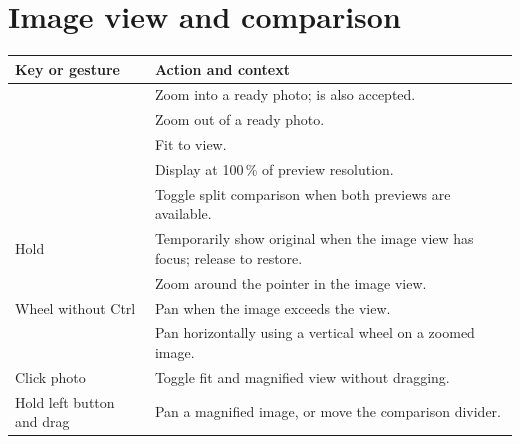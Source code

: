 \clearpage
\section*{Image view and comparison}
\begin{longtable}{@{}L{4.4cm}L{9.2cm}@{}}
\toprule Key or gesture & Action and context\\\midrule\endhead
{} & Zoom into a ready photo;  is also accepted.\\
 & Zoom out of a ready photo.\\
 & Fit to view.\\
 & Display at 100\,\% of preview resolution.\\
 & Toggle split comparison when both previews are available.\\
Hold  & Temporarily show original when the image view has focus; release to restore.\\
 & Zoom around the pointer in the image view.\\
Wheel without Ctrl & Pan when the image exceeds the view.\\
 & Pan horizontally using a vertical wheel on a zoomed image.\\
Click photo & Toggle fit and magnified view without dragging.\\
Hold left button and drag & Pan a magnified image, or move the comparison divider.\\
\bottomrule
\end{longtable}

\clearpage
